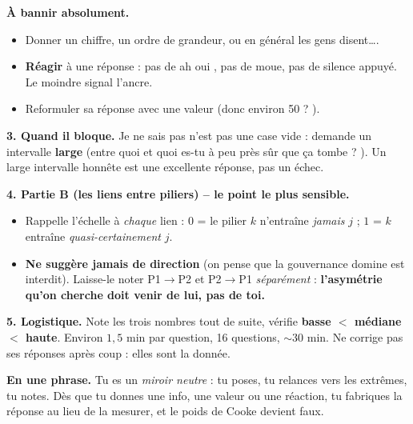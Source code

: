\documentclass[11pt,a4paper]{article}
\begin{document}
\begin{non}
\textbf{À bannir absolument.}
\begin{itemize}[topsep=1pt]
\item Donner un chiffre, un ordre de grandeur, ou \og en général les gens disent\dots \fg.
\item \textbf{Réagir} à une réponse : pas de \og ah oui \fg, pas de moue, pas de silence
      appuyé. Le moindre signal l'ancre.
\item Reformuler sa réponse avec une valeur (\og donc environ 50 ? \fg).
\end{itemize}
\end{non}

\vspace{2pt}
\textbf{3. Quand il bloque.} \og Je ne sais pas \fg{} n'est pas une case vide : demande un
intervalle \textbf{large} (\og entre quoi et quoi es-tu à peu près sûr que ça tombe ? \fg).
Un large intervalle honnête est une excellente réponse, pas un échec.

\vspace{3pt}
\textbf{4. Partie B (les liens entre piliers) -- le point le plus sensible.}
\begin{itemize}
\item Rappelle l'échelle à \emph{chaque} lien : $0$ = le pilier $k$ n'entraîne \emph{jamais}
      $j$ ; $1$ = $k$ entraîne \emph{quasi-certainement} $j$.
\item \textbf{Ne suggère jamais de direction} (\og on pense que la gouvernance domine \fg{} est
      interdit). Laisse-le noter P1$\to$P2 et P2$\to$P1 \emph{séparément} :
      \textbf{l'asymétrie qu'on cherche doit venir de lui, pas de toi.}
\end{itemize}

\vspace{3pt}
\textbf{5. Logistique.} Note les trois nombres tout de suite, vérifie
\textbf{basse $<$ médiane $<$ haute}. Environ $1{,}5$ min par question, 16 questions,
${\sim}30$ min. Ne \og corrige \fg{} pas ses réponses après coup : elles sont la donnée.

\vfill
\begin{cle}
\textbf{En une phrase.} Tu es un \emph{miroir neutre} : tu poses, tu relances vers les
extrêmes, tu notes. Dès que tu donnes une info, une valeur ou une réaction, tu fabriques la
réponse au lieu de la mesurer, et le poids de Cooke devient faux.
\end{cle}
\end{document}
